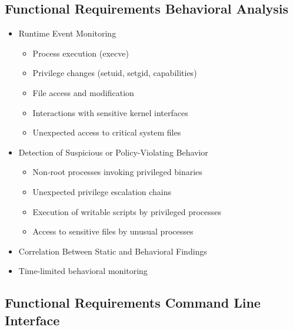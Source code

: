 \subsection{Functional Requirements Behavioral Analysis}
\label{sec:a_frb}

\begin{itemize}
	\item Runtime Event Monitoring
	\begin{itemize}
		\item Process execution (execve)
		\item Privilege changes (setuid, setgid, capabilities)
		\item File access and modification
		\item Interactions with sensitive kernel interfaces
		\item Unexpected access to critical system files
	\end{itemize}
	\item Detection of Suspicious or Policy-Violating Behavior
	\begin{itemize}
		\item Non-root processes invoking privileged binaries
		\item Unexpected privilege escalation chains
		\item Execution of writable scripts by privileged processes
		\item Access to sensitive files by unusual processes
	\end{itemize}
	\item Correlation Between Static and Behavioral Findings
	\item Time-limited behavioral monitoring
\end{itemize}

\subsection{Functional Requirements Command Line Interface}
\label{sec:a_frcli}

